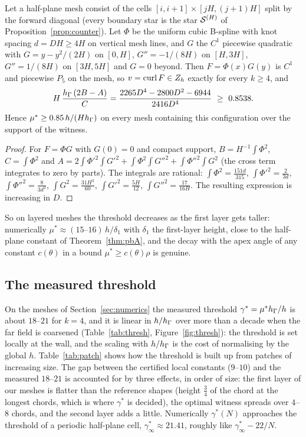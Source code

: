 \begin{proposition}\label{prop:cols}
Let a half-plane mesh consist of the cells $[i,i+1]\times[jH,(j+1)H]$ split by the forward diagonal (every boundary star is the star $\mathcal S^{(H)}$ of Proposition~\ref{prop:counter}). Let $\Phi$ be the uniform cubic B-spline with knot spacing $d=DH\ge4H$ on vertical mesh lines, and $G$ the $C^1$ piecewise quadratic with $G=y-y^2/(2H)$ on $[0,H]$, $G''=-1/(8H)$ on $[H,3H]$, $G''=1/(8H)$ on $[3H,5H]$ and $G=0$ beyond. Then $F=\Phi(x)G(y)$ is $C^1$ and piecewise $P_5$ on the mesh, so $v=\operatorname{curl} F\in Z_h$ exactly for every $k\ge4$, and
\[
H\,\frac{\hG\,(2B-A)}{C}=\frac{2265D^4-2800D^2-6944}{2416D^4}\ \ge\ 0.8538 .
\]
Hence $\mu^\ast\ge0.85\,h/(Hh_\Gamma)$ on every mesh containing this configuration over the support of the witness.
\end{proposition}

\begin{proof}
For $F=\Phi G$ with $G(0)=0$ and compact support, $B=H^{-1}\int\Phi^2$, $C=\int\Phi^2$ and $A=2\int\Phi'^2\int G'^2+\int\Phi^2\int G''^2+\int\Phi''^2\int G^2$ (the cross term integrates to zero by parts). The integrals are rational: $\int\Phi^2=\frac{151d}{315}$, $\int\Phi'^2=\frac2{3d}$, $\int\Phi''^2=\frac8{3d^3}$, $\int G^2=\frac{31H^3}{60}$, $\int G'^2=\frac{5H}{12}$, $\int G''^2=\frac{17}{16H}$. The resulting expression is increasing in $D$.
\end{proof}

So on layered meshes the threshold decreases as the first layer gets taller: numerically $\mu^\ast\approx(15\text{--}16)\,h/\delta_1$ with $\delta_1$ the first-layer height, close to the half-plane constant of Theorem~\ref{thm:pbA}, and the decay with the apex angle of any constant $c(\theta)$ in a bound $\mu^\ast\ge c(\theta)\rho$ is genuine.

\subsection{The measured threshold}
On the meshes of Section~\ref{sec:numerics} the measured threshold $\gamma^\ast=\mu^\ast h_\Gamma/h$ is about $18$--$21$ for $k=4$, and it is linear in $h/h_\Gamma$ over more than a decade when the far field is coarsened (Table~\ref{tab:thresh}, Figure~\ref{fig:thresh}): the threshold is set locally at the wall, and the scaling with $h/h_\Gamma$ is the cost of normalising by the global $h$. Table~\ref{tab:patch} shows how the threshold is built up from patches of increasing size. The gap between the certified local constants ($9$--$10$) and the measured $18$--$21$ is accounted for \cite{PadhiExt} by three effects, in order of size: the first layer of our meshes is flatter than the reference shapes (height $\frac34$ of the chord at the longest chords, which is where $\gamma^\ast$ is decided), the optimal witness spreads over $4$--$8$ chords, and the second layer adds a little. Numerically $\gamma^\ast(N)$ approaches the threshold of a periodic half-plane cell, $\gamma^\ast_\infty\approx21.41$, roughly like $\gamma^\ast_\infty-22/N$.

